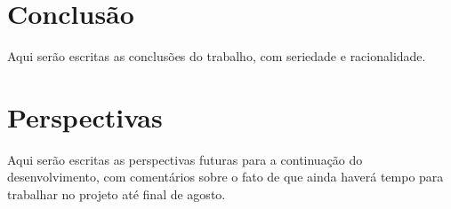 \documentclass[
	12pt,				%
	openright,			%
	twoside,			%
	a4paper,			%
	english,			%
	french,				%
	brazil				%
	]{abntex2}
\begin{document}

\chapter*[Conclusão]{Conclusão}

Aqui serão escritas as conclusões do trabalho, com seriedade e racionalidade.


\chapter*[Perspectivas]{Perspectivas}

Aqui serão escritas as perspectivas futuras para a continuação do desenvolvimento, com 
comentários sobre o fato de que ainda haverá tempo para trabalhar no projeto até final
de agosto.



\postextual



%
%

\end{document}
